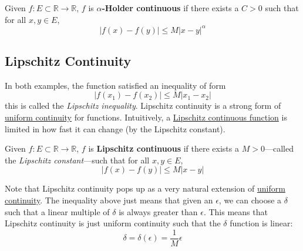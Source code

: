   \begin{definition}
    \label{def:holder-continuity}
    Given $f: E \subset \mathbb{R} \to \mathbb{R}$, $f$ is \textbf{$\alpha$-Holder continuous} if there exists a $C > 0$ such that for all $x, y \in E$, 
    \begin{equation}
      |f(x) - f(y)| \leq M |x - y|^\alpha
    \end{equation}
  \end{definition}

\subsection{Lipschitz Continuity}

  In both examples, the function satisfied an inequality of form 
  \begin{equation}
    |f(x_1) - f(x_2)| \leq M |x_1 - x_2|
  \end{equation}
  this is called the \textit{Lipschitz inequality}. Lipschitz continuity is a strong form of \hyperref[def:uniform-continuity]{uniform continuity} for functions. Intuitively, a \hyperref[def:lipschitz-continuous-function]{Lipschitz continuous function} is limited in how fast it can change (by the Lipschitz constant). 

  \begin{definition}
    \label{def:lipschitz-continuous-function}
    Given $f: E \subset \mathbb{R} \to \mathbb{R}$, $f$ is \textbf{Lipschitz continuous} if there exists a $M > 0$---called the \textit{Lipschitz constant}---such that for all $x, y \in E$, 
    \begin{equation}
      |f(x) - f(y)| \leq M |x - y|
    \end{equation}
  \end{definition}

  Note that Lipschitz continuity pops up as a very natural extension of \hyperref[def:uniform-continuity]{uniform continuity}. The inequality above just means that given an $\epsilon$, we can choose a $\delta$ such that a linear multiple of $\delta$ is always greater than $\epsilon$. This means that Lipschitz continuity is just uniform continuity such that the $\delta$ function is linear:  
  \begin{equation}
    \delta = \delta(\epsilon) = \frac{1}{M} \epsilon
  \end{equation}

